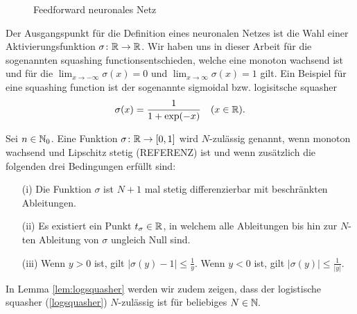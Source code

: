 \begin{center}
\begin{figure}
        \caption{Feedforward neuronales Netz}
        \label{fig:DNN}
    \end{figure}
\end{center}
Der Ausgangspunkt für die Definition eines neuronalen Netzes ist die Wahl einer Aktivierungsfunktion $\sigma\colon \mathbb{R} \to \mathbb{R}$. Wir haben uns in dieser Arbeit für die sogenannten \glqq squashing functions\grqq entschieden, welche eine monoton wachsend ist und für die $\lim_{x \to -\infty}\sigma(x) = 0$ und $\lim_{x \to \infty}\sigma(x) = 1$ gilt. Ein Beispiel für eine squashing function ist der sogenannte sigmoidal bzw. logisitsche squasher
\begin{align}
\label{logsquasher}
\sigma(x) = \frac{1}{1 + \exp(-x)} \quad (x \in \mathbb{R}).
\end{align}

\begin{defn}
\label{nzulässig}
Sei $n \in \mathbb{N}_0$. Eine Funktion $\sigma\colon \mathbb{R} \to [0, 1]$ wird $N$-zulässig genannt, wenn monoton wachsend und Lipschitz stetig (REFERENZ) ist und wenn zusätzlich die folgenden drei Bedingungen erfüllt sind$\colon$
\begin{itemize}
\item[(i)] Die Funktion $\sigma$ ist $N + 1$ mal stetig differenzierbar mit beschränkten Ableitungen.
\item[(ii)] Es existiert ein Punkt $t_{\sigma} \in \mathbb{R}$, in welchem alle Ableitungen bis hin zur $N$-ten Ableitung von $\sigma$ ungleich Null sind.
\item[(iii)] Wenn $y > 0$ ist, gilt $|\sigma(y) - 1| \leq \frac{1}{y}$. Wenn $y < 0$ ist, gilt $|\sigma(y)| \leq \frac{1}{|y|}$.
\end{itemize}  
\end{defn}  

In Lemma \ref{lem:logsquasher} werden wir zudem zeigen, dass der logistische squasher (\ref{logsquasher}) $N$-zulässig ist für beliebiges $N \in \mathbb{N}.$ 

